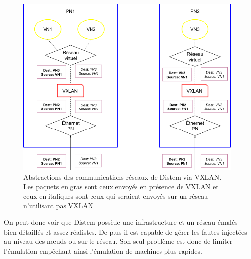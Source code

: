 \begin{figure}
  \centering
  \includegraphics[scale=0.5]{Pictures/png/Distem_VXLAN}
  \caption{Abstractions des communications réseaux de Distem via VXLAN. Les paquets en gras sont ceux envoyés en présence de VXLAN et ceux en italiques sont ceux qui seraient envoyés sur un réseau n'utilisant pas VXLAN}
  \label{Distem_VXLAN}
\end{figure}

On peut donc voir que Distem possède une infrastructure et un réseau émulés bien détaillés et assez réalistes. De plus il est capable de gérer les fautes injectées au niveau des n\oe uds ou sur le réseau. Son seul problème est donc de limiter l'émulation empêchant ainsi l'émulation de machines plus rapides. 
